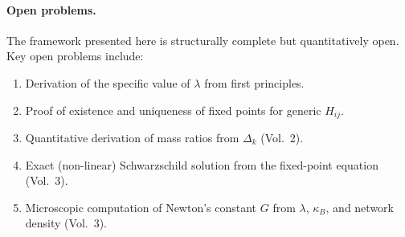 \paragraph{Open problems.}
The framework presented here is structurally complete but
quantitatively open.
Key open problems include:
\begin{enumerate}
  \item Derivation of the specific value of $\lambda$ from first principles.
  \item Proof of existence and uniqueness of fixed points for generic $H_{ij}$.
  \item Quantitative derivation of mass ratios from $\Delta_k$ (Vol.~2).
  \item Exact (non-linear) Schwarzschild solution from the fixed-point
    equation (Vol.~3).
  \item Microscopic computation of Newton's constant $G$ from
    $\lambda$, $\kappa_B$, and network density (Vol.~3).
\end{enumerate}

